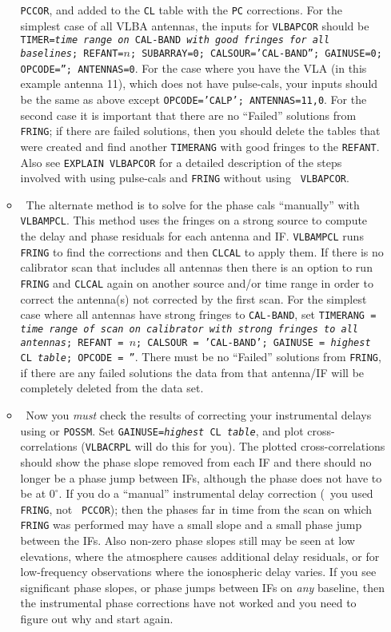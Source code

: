 \begin{enumerate}
\begin{itemize}
{{\tt PCCOR}, and added to the {\tt CL} table with the {\tt PC}
corrections.  For the simplest case of all VLBA antennas, the inputs
for {\tt VLBAPCOR} should be {\tt TIMER={\it time range on} CAL-BAND
{\it with good fringes for all baselines}; REFANT=$n$; SUBARRAY=0;
CALSOUR='CAL-BAND''; GAINUSE=0; OPCODE=''; ANTENNAS=0}\@.  For the
case where you have the VLA (in this example antenna 11), which does
not have pulse-cals, your inputs should be the same as above except
{\tt OPCODE='CALP'; ANTENNAS=11,0}\@.  For the second case it is
important that there are no ``Failed'' solutions from {\tt
FRING}; if there are failed solutions, then you should delete the
tables that were created and find another {\tt TIMERANG} with good
fringes to the {\tt REFANT}.  Also see {\tt EXPLAIN VLBAPCOR} for a
detailed description of the steps involved with using pulse-cals
and {\tt FRING} without using {\tt
  VLBAPCOR}\@.}

\item\ {The alternate method is to solve for the phase cals
``manually'' with {\tt VLBAMPCL}\@.  This method uses the fringes on a
strong source to compute the delay and phase residuals for each
antenna and IF\@. {\tt VLBAMPCL} runs {\tt FRING} to find the
corrections and then {\tt CLCAL} to apply them.  If there is no
calibrator scan that includes all antennas then there is an option to
run {\tt FRING} and {\tt CLCAL} again on another source and/or time
range in order to correct the antenna(s) not corrected by the first
scan. For the simplest case where all antennas have strong fringes to
{\tt CAL-BAND}, set {\tt TIMERANG = {\it time range of scan on
    calibrator with strong fringes to all antennas}; REFANT = $n$;
  CALSOUR = 'CAL-BAND'; GAINUSE = {\it highest} CL {\it table}; OPCODE
  = ''}.  There must be no ``Failed'' solutions from {\tt FRING}, if
there are any failed solutions the data from that antenna/IF will be
completely deleted from the data set.}

\item\ {Now you {\it must} check the results of correcting your
instrumental delays using {\tt {}} or {\tt POSSM}\@.  Set
{\tt GAINUSE={\it highest} CL {\it table}}, and plot
cross-correlations ({\tt VLBACRPL} will do this for you).  The plotted
cross-correlations should show the phase slope removed from each IF
and there should no longer be a phase jump between IFs, although the
phase does not have to be at $0^\circ$.  If you do a ``manual''
instrumental delay correction (\ie\ you used {\tt FRING}\@, not {\tt
PCCOR}); then the phases far in time from the scan on which {\tt
FRING} was performed may have a small slope and a small phase jump
between the IFs.  Also non-zero phase slopes still may be seen at low
elevations, where the atmosphere causes additional delay residuals, or
for low-frequency observations where the ionospheric delay varies.  If
you see significant phase slopes, or phase jumps between IFs on {\it
  any} baseline, then the instrumental phase corrections have not
worked and you need to figure out why and start
again.}
\end{itemize}


\end{enumerate}
